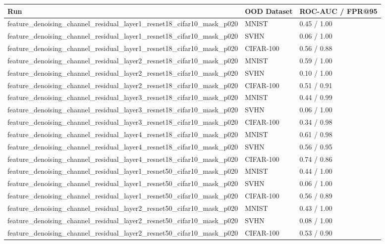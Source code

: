 \begin{tabular}{lll}
\toprule
Run & OOD Dataset & ROC-AUC / FPR@95 \\
\midrule
feature\_denoising\_channel\_residual\_layer1\_resnet18\_cifar10\_mask\_p020 & MNIST & 0.45 / 1.00 \\
feature\_denoising\_channel\_residual\_layer1\_resnet18\_cifar10\_mask\_p020 & SVHN & 0.06 / 1.00 \\
feature\_denoising\_channel\_residual\_layer1\_resnet18\_cifar10\_mask\_p020 & CIFAR-100 & 0.56 / 0.88 \\
feature\_denoising\_channel\_residual\_layer2\_resnet18\_cifar10\_mask\_p020 & MNIST & 0.59 / 1.00 \\
feature\_denoising\_channel\_residual\_layer2\_resnet18\_cifar10\_mask\_p020 & SVHN & 0.10 / 1.00 \\
feature\_denoising\_channel\_residual\_layer2\_resnet18\_cifar10\_mask\_p020 & CIFAR-100 & 0.51 / 0.91 \\
feature\_denoising\_channel\_residual\_layer3\_resnet18\_cifar10\_mask\_p020 & MNIST & 0.44 / 0.99 \\
feature\_denoising\_channel\_residual\_layer3\_resnet18\_cifar10\_mask\_p020 & SVHN & 0.06 / 1.00 \\
feature\_denoising\_channel\_residual\_layer3\_resnet18\_cifar10\_mask\_p020 & CIFAR-100 & 0.34 / 0.98 \\
feature\_denoising\_channel\_residual\_layer4\_resnet18\_cifar10\_mask\_p020 & MNIST & 0.61 / 0.98 \\
feature\_denoising\_channel\_residual\_layer4\_resnet18\_cifar10\_mask\_p020 & SVHN & 0.56 / 0.95 \\
feature\_denoising\_channel\_residual\_layer4\_resnet18\_cifar10\_mask\_p020 & CIFAR-100 & 0.74 / 0.86 \\
feature\_denoising\_channel\_residual\_layer1\_resnet50\_cifar10\_mask\_p020 & MNIST & 0.44 / 1.00 \\
feature\_denoising\_channel\_residual\_layer1\_resnet50\_cifar10\_mask\_p020 & SVHN & 0.06 / 1.00 \\
feature\_denoising\_channel\_residual\_layer1\_resnet50\_cifar10\_mask\_p020 & CIFAR-100 & 0.56 / 0.89 \\
feature\_denoising\_channel\_residual\_layer2\_resnet50\_cifar10\_mask\_p020 & MNIST & 0.43 / 1.00 \\
feature\_denoising\_channel\_residual\_layer2\_resnet50\_cifar10\_mask\_p020 & SVHN & 0.08 / 1.00 \\
feature\_denoising\_channel\_residual\_layer2\_resnet50\_cifar10\_mask\_p020 & CIFAR-100 & 0.53 / 0.90 \\

\end{tabular}
